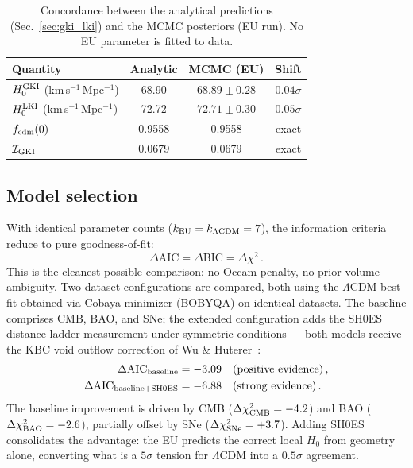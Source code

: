 \documentclass[a4paper,fleqn]{cas-dc}
\begin{document}
\begin{table}[pos=!htbp]
\caption{Concordance between the analytical predictions
(Sec.~\ref{sec:gki_lki}) and the MCMC posteriors (EU run).
No EU parameter is fitted to data.}
\label{tab:concordance}
\begin{tabular}{lccc}
Quantity & Analytic & MCMC (EU) & Shift \\
\hline
$H_0^{\rm GKI}$ (km\,s$^{-1}$\,Mpc$^{-1}$) & 68.90 & $68.89 \pm 0.28$ & $0.04\sigma$ \\
$H_0^{\rm LKI}$ (km\,s$^{-1}$\,Mpc$^{-1}$) & 72.72 & $72.71 \pm 0.30$ & $0.05\sigma$ \\
$f_{\rm cdm}(0)$ & 0.9558 & 0.9558 & exact \\
$\mathcal{I}_{\rm GKI}$ & 0.0679 & 0.0679 & exact \\
\end{tabular}
\end{table}


\subsection{Model selection}
\label{sec:model_selection}

With identical parameter counts ($k_{\rm EU} = k_{\Lambda\rm CDM}
= 7$), the information criteria~\cite{burnham_anderson2002}
reduce to pure goodness-of-fit:
\begin{equation}
\Delta\text{AIC} = \Delta\text{BIC}
  = \Delta\chi^2\,.
\label{eq:aic}
\end{equation}
This is the cleanest possible comparison: no Occam penalty,
no prior-volume ambiguity. Two dataset configurations are
compared, both using the $\Lambda$CDM best-fit obtained via
Cobaya minimizer (BOBYQA) on identical datasets. The
baseline comprises CMB, BAO, and SNe; the extended
configuration adds the SH0ES distance-ladder measurement
under symmetric conditions --- both models receive the KBC
void outflow correction of
Wu \& Huterer~\cite{wu_huterer2017}:
\begin{align}
\Delta\text{AIC}_{\rm baseline}
  &= -3.09 \quad (\text{positive evidence})\,,
  \label{eq:aic_baseline} \\
\Delta\text{AIC}_{\rm baseline+SH0ES}
  &= -6.88 \quad (\text{strong evidence})\,.
  \label{eq:aic_shoes}
\end{align}
The baseline improvement is driven by CMB
($\Delta\chi^2_{\rm CMB} = -4.2$) and BAO
($\Delta\chi^2_{\rm BAO} = -2.6$), partially offset by SNe
($\Delta\chi^2_{\rm SNe} = +3.7$). Adding SH0ES
consolidates the advantage: the EU predicts the correct
local $H_0$ from geometry alone, converting what is a
$5\sigma$ tension for $\Lambda$CDM into a
$0.5\sigma$ agreement.
\end{document}
